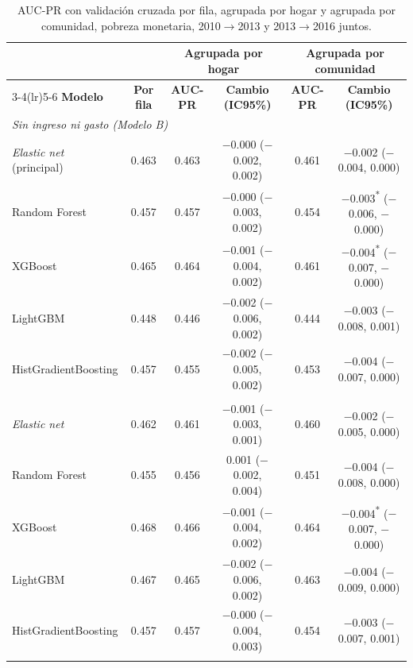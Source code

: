 \begin{table}[H]
  \centering
  \caption{AUC-PR con validación cruzada por fila, agrupada por hogar y agrupada por
  comunidad, pobreza monetaria, 2010$\to$2013 y 2013$\to$2016 juntos.}
  \label{tab:robustez_validacion}
  \footnotesize
  \setlength{\tabcolsep}{4pt}
  \begin{tabular}{l c cc cc}
    \toprule
    & & \multicolumn{2}{c}{\textbf{Agrupada por hogar}} & \multicolumn{2}{c}{\textbf{Agrupada por comunidad}} \\
    \cmidrule(lr){3-4}\cmidrule(lr){5-6}
    \textbf{Modelo} & \textbf{Por fila} & \textbf{AUC-PR} & \textbf{Cambio (IC95\%)} & \textbf{AUC-PR} & \textbf{Cambio (IC95\%)} \\
    \midrule
    \multicolumn{6}{l}{\textit{Sin ingreso ni gasto (Modelo B)}} \\
    \quad \emph{Elastic net} (principal) & 0.463 & 0.463 & $-$0.000 ($-$0.002, 0.002) & 0.461 & $-$0.002 ($-$0.004, 0.000) \\
    \quad Random Forest & 0.457 & 0.457 & $-$0.000 ($-$0.003, 0.002) & 0.454 & $-$0.003\textsuperscript{*} ($-$0.006, $-$0.000) \\
    \quad XGBoost & 0.465 & 0.464 & $-$0.001 ($-$0.004, 0.002) & 0.461 & $-$0.004\textsuperscript{*} ($-$0.007, $-$0.000) \\
    \quad LightGBM & 0.448 & 0.446 & $-$0.002 ($-$0.006, 0.002) & 0.444 & $-$0.003 ($-$0.008, 0.001) \\
    \quad HistGradientBoosting & 0.457 & 0.455 & $-$0.002 ($-$0.005, 0.002) & 0.453 & $-$0.004 ($-$0.007, 0.000) \\
    \addlinespace
    \multicolumn{6}{l}{\textit{Modelo B con DMSP-OLS}} \\
    \quad \emph{Elastic net} & 0.462 & 0.461 & $-$0.001 ($-$0.003, 0.001) & 0.460 & $-$0.002 ($-$0.005, 0.000) \\
    \quad Random Forest & 0.455 & 0.456 & 0.001 ($-$0.002, 0.004) & 0.451 & $-$0.004 ($-$0.008, 0.000) \\
    \quad XGBoost & 0.468 & 0.466 & $-$0.001 ($-$0.004, 0.002) & 0.464 & $-$0.004\textsuperscript{*} ($-$0.007, $-$0.000) \\
    \quad LightGBM & 0.467 & 0.465 & $-$0.002 ($-$0.006, 0.002) & 0.463 & $-$0.004 ($-$0.009, 0.000) \\
    \quad HistGradientBoosting & 0.457 & 0.457 & $-$0.000 ($-$0.004, 0.003) & 0.454 & $-$0.003 ($-$0.007, 0.001) \\
    \addlinespace
    \multicolumn{6}{l}{\textit{Con ingreso y gasto (Modelo A)}} \\

\end{tabular}
\end{table}
